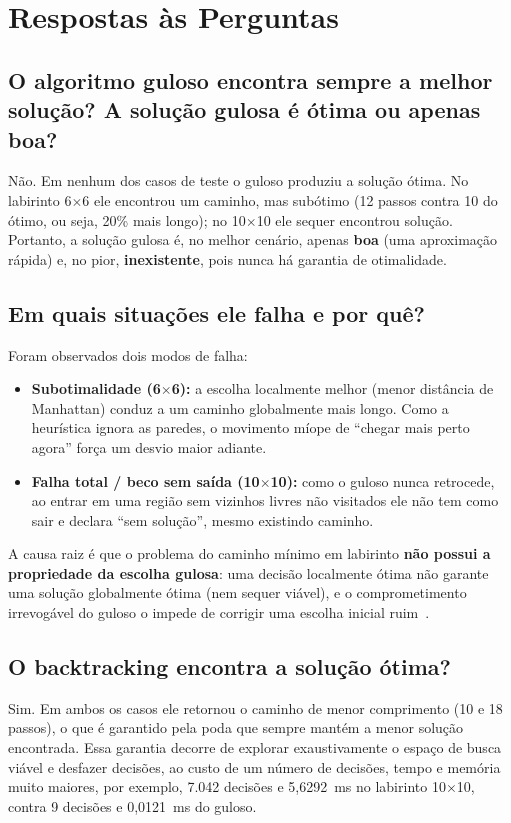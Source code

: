 \documentclass[12pt, a4paper, brazil]{article}
\begin{document}
\section{Respostas às Perguntas}

\subsection{O algoritmo guloso encontra sempre a melhor solução? A solução gulosa é ótima ou apenas boa?}
Não. Em nenhum dos casos de teste o guloso produziu a solução ótima. No labirinto 6$\times$6 ele encontrou um caminho, mas subótimo (12 passos contra 10 do ótimo, ou seja, 20\% mais longo); no 10$\times$10 ele sequer encontrou solução. Portanto, a solução gulosa é, no melhor cenário, apenas \textbf{boa} (uma aproximação rápida) e, no pior, \textbf{inexistente}, pois nunca há garantia de otimalidade.

\subsection{Em quais situações ele falha e por quê?}
Foram observados dois modos de falha:
\begin{itemize}
    \item \textbf{Subotimalidade (6$\times$6):} a escolha localmente melhor (menor distância de Manhattan) conduz a um caminho globalmente mais longo. Como a heurística ignora as paredes, o movimento míope de ``chegar mais perto agora'' força um desvio maior adiante.
    \item \textbf{Falha total / beco sem saída (10$\times$10):} como o guloso nunca retrocede, ao entrar em uma região sem vizinhos livres não visitados ele não tem como sair e declara ``sem solução'', mesmo existindo caminho.
\end{itemize}
A causa raiz é que o problema do caminho mínimo em labirinto \textbf{não possui a propriedade da escolha gulosa}: uma decisão localmente ótima não garante uma solução globalmente ótima (nem sequer viável), e o comprometimento irrevogável do guloso o impede de corrigir uma escolha inicial ruim~\cite{cormen2009}.

\subsection{O backtracking encontra a solução ótima?}
Sim. Em ambos os casos ele retornou o caminho de menor comprimento (10 e 18 passos), o que é garantido pela poda que sempre mantém a menor solução encontrada. Essa garantia decorre de explorar exaustivamente o espaço de busca viável e desfazer decisões, ao custo de um número de decisões, tempo e memória muito maiores, por exemplo, 7.042 decisões e 5,6292~ms no labirinto 10$\times$10, contra 9 decisões e 0,0121~ms do guloso.
\end{document}
